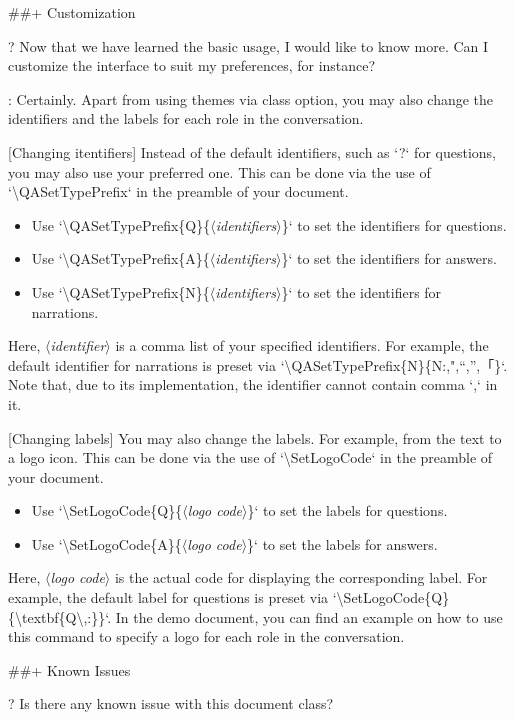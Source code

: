 \documentclass[%
  use style = classical,
  scroll,
]{Q-A}
\newcommand{\meta}[1]{$\langle${\normalfont\itshape#1}$\rangle$}
\begin{document}
##+ {Customization}

?
  Now that we have learned the basic usage, I would like to know more. Can I customize the interface to suit my preferences, for instance?

:
  Certainly. Apart from using themes via class option, you may also change the identifiers and the labels for each role in the conversation.

  [Changing itentifiers]
  Instead of the default identifiers, such as `?` for questions, you may also use your preferred one. This can be done via the use of `\backslash QASetTypePrefix` in the preamble of your document.
  \begin{itemize}
    \item Use `\backslash QASetTypePrefix\{Q\}\{\meta{identifiers}\}` to set the identifiers for questions.
    \item Use `\backslash QASetTypePrefix\{A\}\{\meta{identifiers}\}` to set the identifiers for answers.
    \item Use `\backslash QASetTypePrefix\{N\}\{\meta{identifiers}\}` to set the identifiers for narrations.
  \end{itemize}
  Here, \meta{identifier} is a comma list of your specified identifiers. For example, the default identifier for narrations is preset via `\backslash QASetTypePrefix\{N\}\{N:,",“,”,「\}`. Note that, due to its implementation, the identifier cannot contain comma `,` in it.

  [Changing labels]
  You may also change the labels. For example, from the text  to a logo icon. This can be done via the use of `\backslash SetLogoCode` in the preamble of your document.
  \begin{itemize}
    \item Use `\backslash SetLogoCode\{Q\}\{\meta{logo code}\}` to set the labels for questions.
    \item Use `\backslash SetLogoCode\{A\}\{\meta{logo code}\}` to set the labels for answers.
  \end{itemize}
  Here, \meta{logo code} is the actual code for displaying the corresponding label. For example, the default label for questions is preset via `\backslash SetLogoCode\{Q\}\{\textbackslash textbf\{Q\textbackslash,:\}\}`. In the demo document, you can find an example on how to use this command to specify a logo for each role in the conversation.


##+ {Known Issues}

?
  Is there any known issue with this document class?
\end{document}
